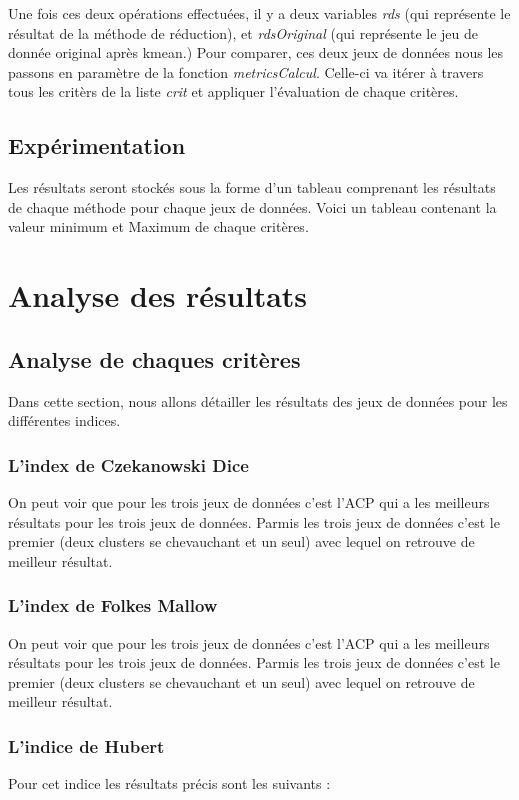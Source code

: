 Une fois ces deux opérations effectuées, il y a deux variables \textit{rds} (qui représente le résultat de la méthode de réduction), et \textit{rdsOriginal} (qui représente le jeu de
donnée original après kmean.) Pour comparer, ces deux jeux de données nous les passons en paramètre de la fonction \textit{metricsCalcul}.
Celle-ci va itérer à travers tous les critèrs de la liste \textit{crit} et appliquer l'évaluation de chaque critères.

\subsection{Expérimentation}
Les résultats seront stockés sous la forme d'un tableau comprenant les résultats de chaque méthode pour chaque jeux de données. 
Voici un tableau contenant la valeur minimum et Maximum de chaque critères.

\section{Analyse des résultats}

\subsection{Analyse de chaques critères}
Dans cette section, nous allons détailler les résultats des jeux de données pour les différentes indices.

\subsubsection{L'index de Czekanowski Dice}
On peut voir que pour les trois jeux de données c'est l'ACP qui a les meilleurs résultats pour les trois jeux de données.
Parmis les trois jeux de données c'est le premier (deux clusters se chevauchant et un seul) avec lequel on retrouve de meilleur résultat.

\subsubsection{L'index de Folkes Mallow}
On peut voir que pour les trois jeux de données c'est l'ACP qui a les meilleurs résultats pour les trois jeux de données.
Parmis les trois jeux de données c'est le premier (deux clusters se chevauchant et un seul) avec lequel on retrouve de meilleur résultat.

\subsubsection{L'indice de Hubert}
Pour cet indice les résultats précis sont les suivants : 
\smallskip

